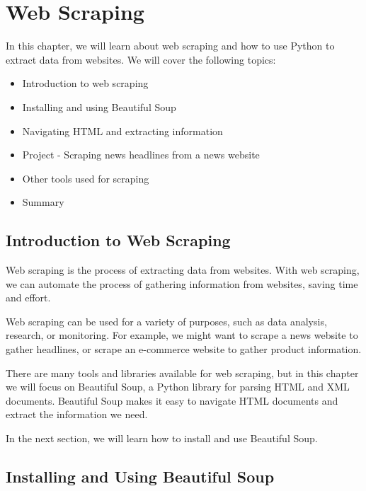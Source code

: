 \documentclass[
  paper=a4,
  ,captions=tableheading
]{scrartcl}
\providecommand{\tightlist}{%
  \setlength{\itemsep}{0pt}\setlength{\parskip}{0pt}}
\begin{document}
\hypertarget{web-scraping}{%
\chapter{Web Scraping}\label{web-scraping}}

In this chapter, we will learn about web scraping and how to use Python
to extract data from websites. We will cover the following topics:

\begin{itemize}
\tightlist
\item
  Introduction to web scraping
\item
  Installing and using Beautiful Soup
\item
  Navigating HTML and extracting information
\item
  Project - Scraping news headlines from a news website
\item
  Other tools used for scraping
\item
  Summary
\end{itemize}

\hypertarget{introduction-to-web-scraping}{%
\section{Introduction to Web
Scraping}\label{introduction-to-web-scraping}}

Web scraping is the process of extracting data from websites. With web
scraping, we can automate the process of gathering information from
websites, saving time and effort.

Web scraping can be used for a variety of purposes, such as data
analysis, research, or monitoring. For example, we might want to scrape
a news website to gather headlines, or scrape an e-commerce website to
gather product information.

There are many tools and libraries available for web scraping, but in
this chapter we will focus on Beautiful Soup, a Python library for
parsing HTML and XML documents. Beautiful Soup makes it easy to navigate
HTML documents and extract the information we need.

In the next section, we will learn how to install and use Beautiful
Soup.

\hypertarget{installing-and-using-beautiful-soup}{%
\section{Installing and Using Beautiful
Soup}\label{installing-and-using-beautiful-soup}}
\end{document}
